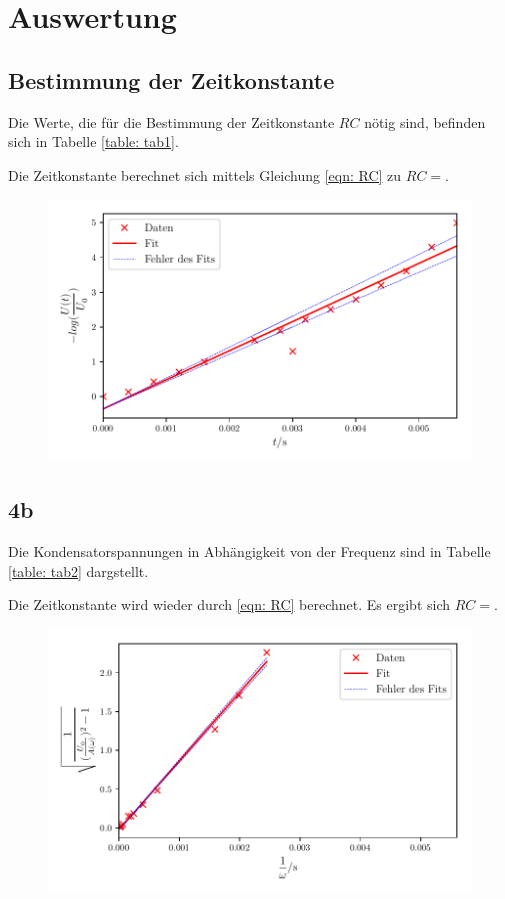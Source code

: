 \section{Auswertung}
\label{sec:Auswertung}


\subsection{Bestimmung der Zeitkonstante}
Die Werte, die für die Bestimmung der Zeitkonstante $RC$ nötig sind, befinden sich in Tabelle \ref{table: tab1}.


Die Zeitkonstante berechnet sich mittels Gleichung \eqref{eqn: RC} zu $RC = $. %

\begin{figure}
  \centering
  \includegraphics{build/plota.pdf}
  \caption{}
  \label{fig:plota}
\end{figure}

\subsection{4b}
Die Kondensatorspannungen in Abhängigkeit von der Frequenz sind in Tabelle \ref{table: tab2} dargstellt. %



Die Zeitkonstante wird wieder durch \eqref{eqn: RC} berechnet. Es ergibt sich $RC = $. %

\begin{figure}
  \centering
  \includegraphics{build/plotb.pdf}
  \caption{}
  \label{fig:plotb}
\end{figure}

